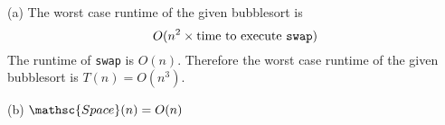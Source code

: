 (a)
The worst case runtime of the given bubblesort is
\[
O(n^2 \times \text{time to execute \texttt{swap}})
\]
The runtime of \verb!swap! is $O(n)$.
Therefore the worst case runtime of the given bubblesort is
$T(n) = O(n^3)$.

(b)
$\mathsc{Space}(n) = O(n)$
